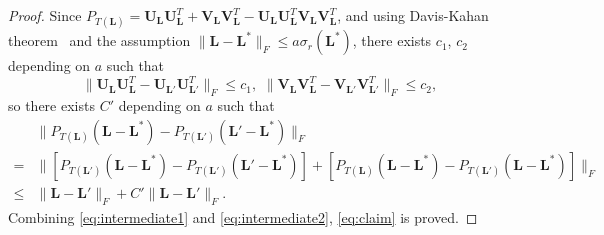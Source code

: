 \documentclass[12pt]{article}
\newcommand{\bL}{\boldsymbol{L}}
\newcommand{\bU}{\boldsymbol{U}}
\newcommand{\bV}{\boldsymbol{V}}
\def\bU{\boldsymbol{U}}
\theoremstyle{plain}
\theoremstyle{definition}
\theoremstyle{plain}
\theoremstyle{plain}
\theoremstyle{remark}
\begin{document}
\begin{proof}
Since $P_{T(\bL)}=\bU_{\bL}\bU_{\bL}^T+\bV_{\bL}\bV_{\bL}^T-\bU_{\bL}\bU_{\bL}^T\bV_{\bL}\bV_{\bL}^T$, and using Davis-Kahan theorem~\cite{doi:10.1137/0707001} and the assumption $\|\bL-\bL^*\|_F\leq a\sigma_r(\bL^*)$, there exists $c_1$, $c_2$ depending on $a$ such that  
\[
\|\bU_{\bL}\bU_{\bL}^T-\bU_{\bL'}\bU_{\bL'}^T\|_F\leq c_1,\,\,
\|\bV_{\bL}\bV_{\bL}^T-\bV_{\bL'}\bV_{\bL'}^T\|_F\leq c_2,
\]
so there exists $C'$ depending on $a$ such that
\begin{align}\label{eq:intermediate2}
&\|P_{T(\bL)}(\bL-\bL^*)-P_{T(\bL')}(\bL'-\bL^*)\|_F\\ \nonumber=&\|[P_{T(\bL')}(\bL-\bL^*)-P_{T(\bL')}(\bL'-\bL^*)]+[P_{T(\bL)}(\bL-\bL^*)-P_{T(\bL')}(\bL-\bL^*)]\|_F\\\leq&\|\bL-\bL'\|_F+C'\|\bL-\bL'\|_F. \nonumber
\end{align}
Combining \eqref{eq:intermediate1} and \eqref{eq:intermediate2},  \eqref{eq:claim} is proved.



\end{proof}
\end{document}
